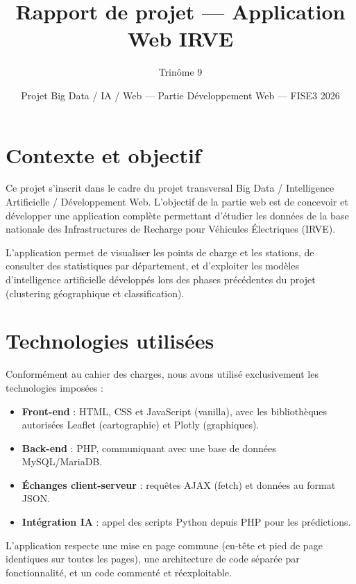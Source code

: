 \documentclass[a4paper,11pt]{article}
\title{\textbf{Rapport de projet --- Application Web IRVE}}
\author{Trinôme 9}
\date{Projet Big Data / IA / Web --- Partie Développement Web --- FISE3 2026}
\begin{document}
\maketitle
\tableofcontents
\newpage

\section{Contexte et objectif}

Ce projet s'inscrit dans le cadre du projet transversal Big Data / Intelligence
Artificielle / Développement Web. L'objectif de la partie web est de concevoir et
développer une application complète permettant d'étudier les données de la base
nationale des Infrastructures de Recharge pour Véhicules Électriques (IRVE).

L'application permet de visualiser les points de charge et les stations, de consulter
des statistiques par département, et d'exploiter les modèles d'intelligence artificielle
développés lors des phases précédentes du projet (clustering géographique et
classification).

\section{Technologies utilisées}

Conformément au cahier des charges, nous avons utilisé exclusivement les technologies
imposées :

\begin{itemize}[noitemsep]
  \item \textbf{Front-end} : HTML, CSS et JavaScript (vanilla), avec les bibliothèques
        autorisées Leaflet (cartographie) et Plotly (graphiques).
  \item \textbf{Back-end} : PHP, communiquant avec une base de données MySQL/MariaDB.
  \item \textbf{Échanges client-serveur} : requêtes AJAX (fetch) et données au format JSON.
  \item \textbf{Intégration IA} : appel des scripts Python depuis PHP pour les prédictions.
\end{itemize}

L'application respecte une mise en page commune (en-tête et pied de page identiques sur
toutes les pages), une architecture de code séparée par fonctionnalité, et un code
commenté et réexploitable.
\end{document}
